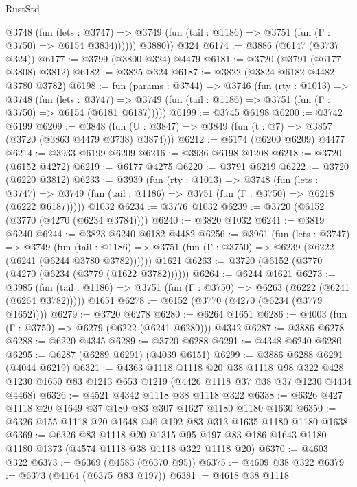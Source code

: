 \begin{lexlean}{RustStd}
\begin{coremodule}
            @3748
              (fun (lets : @3747) =>
              @3749 (fun (tail : @1186) => @3751 (fun (Γ : @3750) => @6154 @3834))))))
        @3880))
    @324
@6174 := @3886 (@6147 (@3737 @324))
@6177 := @3799 (@3800 @324) @4479
@6181 := @3720 (@3791 (@6177 @3808) @3812)
@6182 := @3825 @324
@6187 := @3822 (@3824 @6182 @4482 @3780 @3782)
@6198 := fun (params : @3744) =>
  @3746
    (fun (rty : @1013) =>
    @3748
      (fun (lets : @3747) =>
      @3749 (fun (tail : @1186) => @3751 (fun (Γ : @3750) => @6154 (@6181 @6187)))))
@6199 := @3745 @6198
@6200 := @3742 @6199
@6209 := @3848 (fun (U : @3847) => @3849 (fun (t : @7) => @3857 (@3720 (@3863 @4479 @3738) @3874)))
@6212 := @6174 (@6200 @6209) @4477
@6214 := @3933 @6199 @6209
@6216 := @3936 @6198 @1208
@6218 := @3720 (@6152 @4272)
@6219 := @6177 @4275
@6220 := @3791 @6219
@6222 := @3720 (@6220 @3812)
@6233 := @3939
    (fun (rty : @1013) =>
    @3748
      (fun (lets : @3747) =>
      @3749 (fun (tail : @1186) => @3751 (fun (Γ : @3750) => @6218 (@6222 @6187)))))
    @1032
@6234 := @3776 @1032
@6239 := @3720 (@6152 (@3770 (@4270 (@6234 @3784))))
@6240 := @3820 @1032
@6241 := @3819 @6240
@6244 := @3823 @6240 @6182 @4482
@6256 := @3961
    (fun (lets : @3747) =>
    @3749
      (fun (tail : @1186) => @3751 (fun (Γ : @3750) => @6239 (@6222 (@6241 (@6244 @3780 @3782))))))
    @1621
@6263 := @3720 (@6152 (@3770 (@4270 (@6234 (@3779 (@1622 @3782))))))
@6264 := @6244 @1621
@6273 := @3985
    (fun (tail : @1186) => @3751 (fun (Γ : @3750) => @6263 (@6222 (@6241 (@6264 @3782)))))
    @1651
@6278 := @6152 (@3770 (@4270 (@6234 (@3779 @1652))))
@6279 := @3720 @6278
@6280 := @6264 @1651
@6286 := @4003 (fun (Γ : @3750) => @6279 (@6222 (@6241 @6280))) @4342
@6287 := @3886 @6278
@6288 := @6220 @4345
@6289 := @3720 @6288
@6291 := @4348 @6240 @6280
@6295 := @6287 (@6289 @6291) (@4039 @6151)
@6299 := @3886 @6288 @6291 (@4044 @6219)
@6321 := @4363
    @1118
    @1118
    @20
    @38
    @1118
    @98
    @322
    @428
    @1230
    @1650
    @83
    @1213
    @653
    @1219
    (@4426 @1118 @37 @38 @37 @1230 @4434 @4468)
@6326 := @4521 @4342 @1118 @38 @1118 @322
@6338 := @6326 @427 @1118 @20 @1649 @37 @180 @83 @307 @1627 @1180 @1180 @1630
@6350 := @6326 @155 @1118 @20 @1648 @46 @192 @83 @313 @1635 @1180 @1180 @1638
@6369 := @6326
    @83
    @1118
    @20
    @1315
    @95
    @197
    @83
    @186
    @1643
    @1180
    @1180
    @1373
    (@4574 @1118 @38 @1118 @322 @1118 @20)
@6370 := @4603 @322
@6373 := @6369 (@4583 (@6370 @95))
@6375 := @4609 @38 @322
@6379 := @6373 (@4164 (@6375 @83 @197))
@6381 := @4618 @38 @1118

\end{coremodule}
\end{lexlean}
